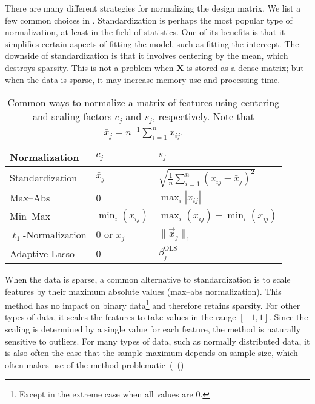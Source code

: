 There are many different strategies for normalizing the design matrix. We list a few common
choices in . Standardization is perhaps the most popular type
of normalization, at least in the field of statistics. One of its benefits is that it
simplifies certain aspects of fitting the model, such as fitting the intercept. The
downside of standardization is that it involves centering by the mean, which destroys
sparsity. This is not a problem when \(\bm{X}\) is stored as a dense matrix; but when the
data is sparse, it may increase memory use and processing time.

\begin{table}[hbt]
  \centering
  \caption{
    Common ways to normalize a matrix of features using centering and scaling
    factors \(c_j\) and \(s_j\), respectively. Note that \(\bar{x}_j =
    n^{-1}\sum_{i=1}^n x_{ij}\).
  }
  \label{tab:normalization-types}
  \vskip 0.15in
  \small
  \begin{tabular}{lll}
    \toprule
    Normalization            & \(c_{j}\)          & \(s_j\)                                                   \\
    \midrule
    Standardization          & \(\bar{x}_j\)      & \(\sqrt{\frac{1}{n}\sum_{i=1}^n (x_{ij} - \bar{x}_j)^2}\) \\
    \addlinespace
    Max--Abs                 & 0                  & \(\max_i|x_{ij}|\)                                        \\
    \addlinespace
    Min--Max                 & \(\min_i(x_{ij})\) & \(\max_i(x_{ij}) - \min_i(x_{ij})\)                       \\
    \addlinespace
    \(\ell_1\)-Normalization & 0 or \(\bar{x}_j\) & \(\lVert \vec{x}_j\rVert_1\)                              \\
    \addlinespace
    Adaptive Lasso           & 0                  & \(\beta_j^\text{OLS}\)                                    \\
    \bottomrule
  \end{tabular}
\end{table}

When the data is sparse, a common alternative to standardization is to scale features by
their maximum absolute values (max--abs normalization). This method has no impact on binary
data\footnote{Except in the extreme case when all values are 0.} and therefore retains
sparsity. For other types of data, it scales the features to take values in the range
\([-1, 1]\). Since the scaling is determined by a single value for each feature, the method
is naturally sensitive to outliers. For many types of data, such as normally distributed
data, it is also often the case that the sample maximum depends on sample size, which often
makes use of the method problematic~(~()

